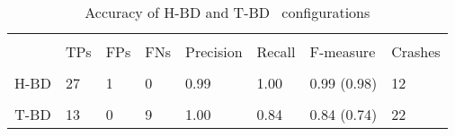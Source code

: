\begin{table*}
\begin{small}
\begin{center}
\begin{tabular}{|c||C{1.4cm}|C{1.4cm}|C{1.4cm}|C{1.4cm}|C{1.4cm}|C{1.4cm}|C{1.4cm}|}
 \hline
 & & & & & & & \\[-0.08in]
      & TPs & FPs & FNs & Precision & Recall & F-measure & Crashes \\[0.06in]
\hline
 & & & & & & & \\[-0.08in]
 H-BD  & 27  & 1    & 0   &  0.99 & 1.00 & 0.99 (0.98) & 12 \\[0.06in]
\hline
 & & & & & & & \\[-0.08in]
 T-BD & 13    &  0   &   9      & 1.00 & 0.84 & 0.84 (0.74) & 22       \\[0.06in]
\hline
\end{tabular}
 \end{center}
 \caption{\label{Ta:realworldAccuracy}Accuracy of H-BD and T-BD \Tool\ configurations}
\end{small}
\end{table*}


